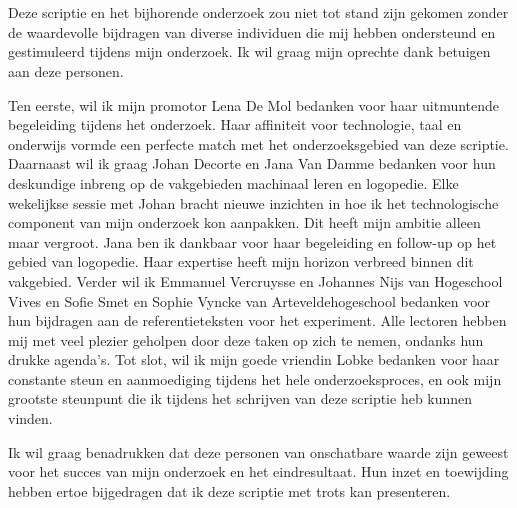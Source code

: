 
\chapter*{}%
\label{ch:voorwoord}

Deze scriptie en het bijhorende onderzoek zou niet tot stand zijn gekomen zonder de waardevolle bijdragen van diverse individuen die mij hebben ondersteund en gestimuleerd tijdens mijn onderzoek. Ik wil graag mijn oprechte dank betuigen aan deze personen.

\medspace

Ten eerste, wil ik mijn promotor Lena De Mol bedanken voor haar uitmuntende begeleiding tijdens het onderzoek. Haar affiniteit voor technologie, taal en onderwijs vormde een perfecte match met het onderzoeksgebied van deze scriptie. Daarnaast wil ik graag Johan Decorte en Jana Van Damme bedanken voor hun deskundige inbreng op de vakgebieden machinaal leren en logopedie. Elke wekelijkse sessie met Johan bracht nieuwe inzichten in hoe ik het technologische component van mijn onderzoek kon aanpakken. Dit heeft mijn ambitie alleen maar vergroot. Jana ben ik dankbaar voor haar begeleiding en follow-up op het gebied van logopedie. Haar expertise heeft mijn horizon verbreed binnen dit vakgebied. Verder wil ik Emmanuel Vercruysse en Johannes Nijs van Hogeschool Vives en Sofie Smet en Sophie Vyncke van Arteveldehogeschool bedanken voor hun bijdragen aan de referentieteksten voor het experiment. Alle lectoren hebben mij met veel plezier geholpen door deze taken op zich te nemen, ondanks hun drukke agenda’s. Tot slot, wil ik mijn goede vriendin Lobke bedanken voor haar constante steun en aanmoediging tijdens het hele onderzoeksproces, en ook mijn grootste steunpunt die ik tijdens het schrijven van deze scriptie heb kunnen vinden.

\medspace

Ik wil graag benadrukken dat deze personen van onschatbare waarde zijn geweest voor het succes van mijn onderzoek en het eindresultaat. Hun inzet en toewijding hebben ertoe bijgedragen dat ik deze scriptie met trots kan presenteren.